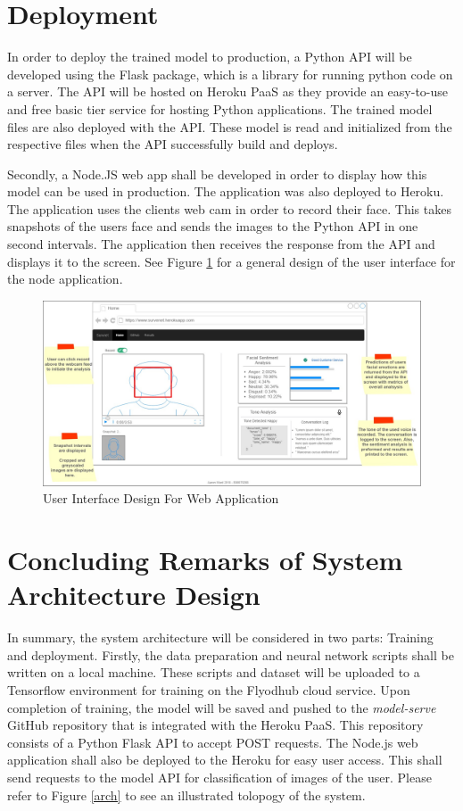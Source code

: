 \section{Deployment}
In order to deploy the trained model to production, a Python API will be developed using the Flask package, which is a library for running python code on a server. The API will be hosted on Heroku PaaS as they provide an easy-to-use and free basic tier service for hosting Python applications. The trained model files are also deployed with the API. These model is read and initialized from the respective files when the API successfully build and deploys.

Secondly, a Node.JS web app shall be developed in order to display how this model can be used in production. The application was also deployed to Heroku. The application uses the clients web cam in order to record their face. This takes snapshots of the users face and sends the images to the Python API in one second intervals. The application then receives the response from the API and displays it to the screen. 
See Figure \ref{ui} for a general design of the user interface for the node application.


\begin{figure}[ht]
	\begin{center}
		\advance\leftskip-3cm
		\advance\rightskip-3cm
		\includegraphics[keepaspectratio=true,scale=0.35]{__resources/Design/mockup_annotated.jpg}
		\caption{User Interface Design For Web Application}
		\label{ui}
	\end{center}
\end{figure}


\section{Concluding Remarks of System Architecture Design}
In summary, the system architecture will be considered in two parts: Training and deployment. Firstly, the data preparation and neural network scripts shall be written on a local machine. These scripts and dataset will be uploaded to a Tensorflow environment for training on the Flyodhub cloud service. Upon completion of training, the model will be saved and pushed to the \textit{model-serve} GitHub repository that is integrated with the Heroku PaaS. This repository consists of a Python Flask API to accept POST requests. The Node.js web application shall also be deployed to the Heroku for easy user access. This shall send requests to the model API for classification of images of the user.
Please refer to Figure \ref{arch} to see an illustrated tolopogy of the system.

